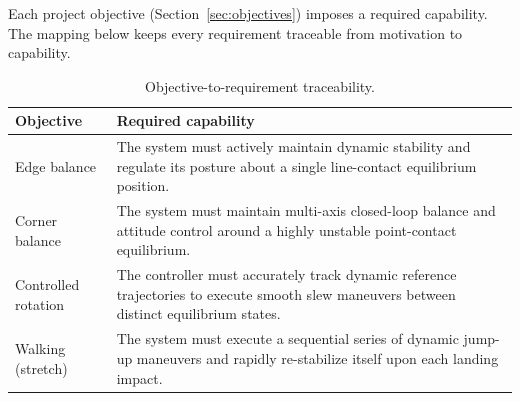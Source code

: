 Each project objective (Section~\ref{sec:objectives}) imposes a required capability.
The mapping below keeps every requirement traceable from motivation to capability.

\begin{table}[htbp]
\centering
\caption[Objective-to-requirement traceability]{Objective-to-requirement traceability.}
\label{tab:traceability}
\begin{tabular}{lp{}}
\toprule
Objective & Required capability \\
\midrule
Edge balance        & The system must actively maintain dynamic stability and regulate its posture about a single line-contact equilibrium position. \\[0.5em]
Corner balance      & The system must maintain multi-axis closed-loop balance and attitude control around a highly unstable point-contact equilibrium. \\[0.5em]
Controlled rotation & The controller must accurately track dynamic reference trajectories to execute smooth slew maneuvers between distinct equilibrium states. \\[0.5em]
Walking (stretch)   & The system must execute a sequential series of dynamic jump-up maneuvers and rapidly re-stabilize itself upon each landing impact. \\
\bottomrule
\end{tabular}
\end{table}

